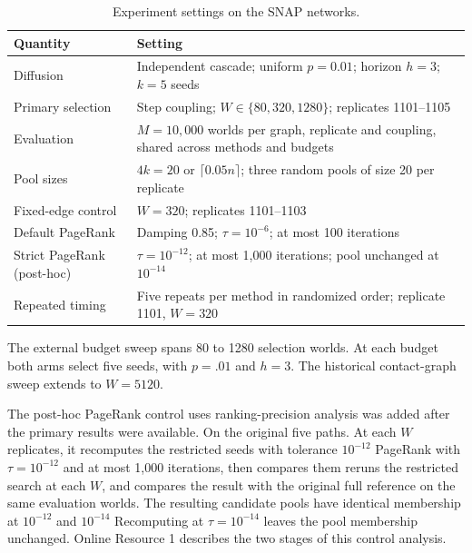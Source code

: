 \documentclass[smallextended]{svjour3}
\providecommand{\DIFaddtex}[1]{{\protect\color{blue} \sf #1}} %
\providecommand{\DIFdeltex}[1]{{\protect\color{red} \scriptsize #1}} %
\providecommand{\DIFaddbegin}{} %
\providecommand{\DIFaddend}{} %
\providecommand{\DIFdelbegin}{} %
\providecommand{\DIFdelend}{} %
\providecommand{\DIFadd}[1]{\texorpdfstring{\DIFaddtex{#1}}{#1}} %
\providecommand{\DIFdel}[1]{\texorpdfstring{\DIFdeltex{#1}}{}} %
\providecommand{\DIFscaledelfig}{0.5}
\newlength{\DIFdelgraphicswidth} %
\newlength{\DIFdelgraphicsheight} %
\providecommand{\DIFaddincludegraphics}[2][]{{\color{blue}\fbox{\DIFOincludegraphics[#1]{#2}}}} %
\providecommand{\DIFdelincludegraphics}[2][]{%
\sbox{\DIFdelgraphicsbox}{\DIFOincludegraphics[#1]{#2}}%
\settoboxwidth{\DIFdelgraphicswidth}{\DIFdelgraphicsbox} %
\settoboxtotalheight{\DIFdelgraphicsheight}{\DIFdelgraphicsbox} %
\scalebox{\DIFscaledelfig}{%
\parbox[b]{\DIFdelgraphicswidth}{\usebox{\DIFdelgraphicsbox}\\[-\baselineskip] \rule{\DIFdelgraphicswidth}{0em}}\llap{\resizebox{\DIFdelgraphicswidth}{\DIFdelgraphicsheight}{%
\setlength{\unitlength}{\DIFdelgraphicswidth}%
\begin{picture}(1,1)%
\thicklines\linethickness{2pt} %
{\color[rgb]{1,0,0}\put(0,0){\framebox(1,1){}}}%
{\color[rgb]{1,0,0}\put(0,0){\line( 1,1){1}}}%
{\color[rgb]{1,0,0}\put(0,1){\line(1,-1){1}}}%
\end{picture}%
}\hspace*{3pt}}} %
} %
\DeclareRobustCommand{\DIFaddbegin}{\DIFOaddbegin \let\includegraphics\DIFaddincludegraphics} %
\DeclareRobustCommand{\DIFaddend}{\DIFOaddend \let\includegraphics\DIFOincludegraphics} %
\DeclareRobustCommand{\DIFdelbegin}{\DIFOdelbegin \let\includegraphics\DIFdelincludegraphics} %
\DeclareRobustCommand{\DIFdelend}{\DIFOaddend \let\includegraphics\DIFOincludegraphics} %
\begin{document}
\begin{table}[htbp]
\caption{Experiment settings on the SNAP networks.}\label{tab:settings}
\begin{tabularx}{\linewidth}{lX}
\toprule
Quantity & Setting \\
\midrule
Diffusion & Independent cascade; uniform $p=0.01$; horizon $h=3$; $k=5$ seeds \\
Primary selection & Step coupling; $W\in\{80,320,1280\}$; replicates 1101--1105 \\
Evaluation & $M=10{,}000$ worlds per graph, replicate and coupling, shared across methods and budgets \\
Pool sizes & $4k=20$ or $\lceil0.05n\rceil$; three random pools of size 20 per replicate \\
Fixed-edge control & $W=320$; replicates 1101--1103 \\
Default PageRank & Damping 0.85; $\tau=10^{-6}$; at most 100 iterations \\
Strict PageRank (post-hoc) & $\tau=10^{-12}$; at most 1,000 iterations; pool unchanged at $10^{-14}$ \\
Repeated timing & Five repeats per method in randomized order; replicate 1101, $W=320$ \\
\bottomrule
\end{tabularx}
\end{table}

The \DIFdelbegin \DIFdel{external budget sweep spans 80 to 1280 selection worlds. At each budget both arms select five seeds, with $p=.01$ and $h=3$. The historical contact-graph sweep extends to $W=5120$.
}%

\DIFdel{The post-hoc PageRank control uses }\DIFdelend \DIFaddbegin \DIFadd{ranking-precision analysis was added after the primary results were available. On }\DIFaddend the original five \DIFdelbegin \DIFdel{paths. At each $W$}\DIFdelend \DIFaddbegin \DIFadd{replicates}\DIFaddend , it recomputes \DIFdelbegin \DIFdel{the restricted seeds with tolerance $10^{-12}$ }\DIFdelend \DIFaddbegin \DIFadd{PageRank with $\tau=10^{-12}$ }\DIFaddend and at most 1,000 iterations, \DIFdelbegin \DIFdel{then compares them }\DIFdelend \DIFaddbegin \DIFadd{reruns the restricted search at each $W$, and compares the result }\DIFaddend with the original full reference on the same evaluation worlds. \DIFdelbegin \DIFdel{The resulting candidate pools have identical membership at $10^{-12}$ and $10^{-14}$}\DIFdelend \DIFaddbegin \DIFadd{Recomputing at $\tau=10^{-14}$ leaves the pool membership unchanged}\DIFaddend . Online Resource 1 describes the two stages of this \DIFdelbegin \DIFdel{control}\DIFdelend \DIFaddbegin \DIFadd{analysis}\DIFaddend .
\end{document}
